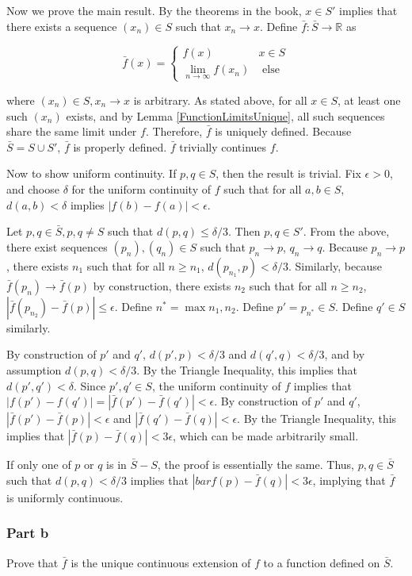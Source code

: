\documentclass{article}
\newcommand{\R}{\mathbb{R}}
\begin{document}
Now we prove the main result. By the theorems in the book, $x \in S'$ implies that there exists a sequence $(x_n) \in S$ such that $x_n \rightarrow x$. Define $\bar{f}: \bar{S} \rightarrow \R$ as

\[
\bar{f}(x) = 
\begin{cases}
f(x) & x \in S \\
\lim_{n \rightarrow \infty} f(x_n) & \text{ else}
\end{cases}
\]

where $(x_n) \in S, x_n \rightarrow x$ is arbitrary. As stated above, for all $x \in S$, at least one such $(x_n)$ exists, and by Lemma \ref{FunctionLimitsUnique}, all such sequences share the same limit under $f$. Therefore, $\bar{f}$ is uniquely defined. Because $\bar{S} = S \cup S'$, $\bar{f}$ is properly defined. $\bar{f}$ trivially continues $f$.

Now to show uniform continuity. If $p, q \in S$, then the result is trivial. Fix $\epsilon > 0$, and choose $\delta$ for the uniform continuity of $f$ such that for all $a, b \in S$, $d(a, b) < \delta$ implies $|f(b) - f(a)| < \epsilon$.

Let $p, q \in \bar{S}, p, q \neq S$ such that $d(p, q) \leq \delta/3$. Then $p, q \in S'$. From the above, there exist sequences $(p_n), (q_n) \in S$ such that $p_n \rightarrow p$, $q_n \rightarrow q$. Because $p_n \rightarrow p$, there exists $n_1$ such that for all $n \geq n_1$, $d(p_{n_1}, p) < \delta/3$. Similarly, because $\bar{f}(p_n) \rightarrow \bar{f}(p)$ by construction, there exists $n_2$ such that for all $n \geq n_2$, $|\bar{f}(p_{n_2}) - \bar{f}(p)| \leq \epsilon$. Define $n^* = \max{n_1, n_2}$. Define $p' = p_{n^*} \in S$. Define $q' \in S$ similarly.

By construction of $p'$ and $q'$, $d(p', p) < \delta/3$ and $d(q', q) < \delta/3$, and by assumption $d(p, q) < \delta/3$. By the Triangle Inequality, this implies that $d(p', q') < \delta$. Since $p', q' \in S$, the uniform continuity of $f$ implies that $|f(p') - f(q')| = |\bar{f}(p') - \bar{f}(q')| < \epsilon$. By construction of $p'$ and $q'$, $|\bar{f}(p') - \bar{f}(p)| < \epsilon$ and $|\bar{f}(q') - \bar{f}(q)| < \epsilon$. By the Triangle Inequality, this implies that $|\bar{f}(p) - \bar{f}(q)| < 3\epsilon$, which can be made arbitrarily small.

If only one of $p$ or $q$ is in $\bar{S} - S$, the proof is essentially the same. Thus, $p, q \in \bar{S}$ such that $d(p, q) < \delta/3$ implies that $|bar{f}(p) - \bar{f}(q)| < 3\epsilon$, implying that $\bar{f}$ is uniformly continuous.

\subsubsection{Part b}

Prove that $\bar{f}$ is the unique continuous extension of $f$ to a function defined on $\bar{S}$.
\end{document}

